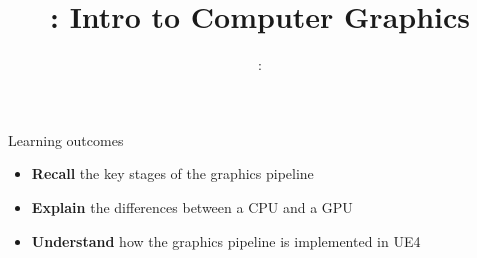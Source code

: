 \usepackage{../../beamerthemeFalmouthGamesAcademy}
\usepackage{multimedia}
\graphicspath{ {../../} }


\usepackage[normalem]{ulem}
\usepackage{wasysym}

\usepackage{pdfpages}

\usetikzlibrary{arrows,automata}




\title{\sessionnumber: Intro to Computer Graphics}
\subtitle{\modulecode: \moduletitle}

\frame{\titlepage} 

\begin{frame}{Learning outcomes}
\begin{itemize}
	\item \textbf{Recall} the key stages of the graphics pipeline
	\item \textbf{Explain} the differences between a CPU and a GPU
	\item \textbf{Understand} how the graphics pipeline is implemented in UE4
\end{itemize}
\end{frame}







